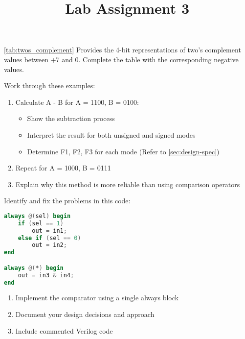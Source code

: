 \documentclass[12pt]{labmanual}
\title{Lab Assignment 3}
\author{}
\date{}
\begin{document}
\maketitle
\clearpage
\tableofcontents
\clearpage 

\vspace{1em}
\begin{questionssection}
\begin{question}    
\autoref{tab:twos_complement} Provides the 4-bit representations of two's complement values between +7 and 0. Complete the table with the corresponding negative values.
\end{question}
\begin{question}
Work through these examples:
\begin{enumerate}
    \item Calculate A - B for A = 1100, B = 0100:
    \begin{itemize}
        \item Show the subtraction process
        \item Interpret the result for both unsigned and signed modes
        \item Determine F1, F2, F3 for each mode (Refer to \autoref{sec:design-spec})
    \end{itemize}
    \item Repeat for A = 1000, B = 0111
    \item Explain why this method is more reliable than using comparison operators
\end{enumerate}
\end{question}
\begin{question}
Identify and fix the problems in this code:
\begin{lstlisting}[language=verilog]
always @(sel) begin
    if (sel == 1)
        out = in1;
    else if (sel == 0)
        out = in2;
end

always @(*) begin
    out = in3 & in4;
end
\end{lstlisting}
\end{question}
\begin{question}
\begin{enumerate}
    \item Implement the comparator using a single always block
    \item Document your design decisions and approach
    \item Include commented Verilog code
\end{enumerate}
\end{question}


\end{questionssection}
\end{document}
